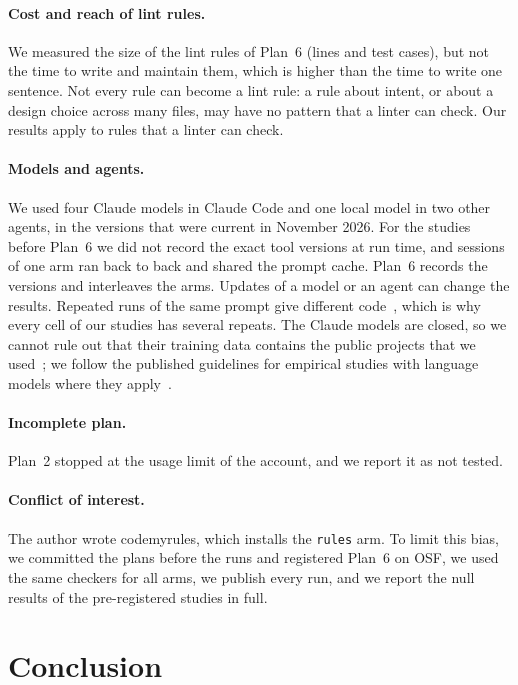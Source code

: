 \documentclass[pdflatex,sn-mathphys-num]{sn-jnl}
\newcommand{\arm}[1]{\texttt{#1}}
\begin{document}
\paragraph{Cost and reach of lint rules.}
We measured the size of the lint rules of Plan~6 (lines and test cases), but not the time to write and maintain them, which is higher than the time to write one sentence.
Not every rule can become a lint rule: a rule about intent, or about a design choice across many files, may have no pattern that a linter can check.
Our results apply to rules that a linter can check.

\paragraph{Models and agents.}
We used four Claude models in Claude Code and one local model in two other agents, in the versions that were current in November 2026.
For the studies before Plan~6 we did not record the exact tool versions at run time, and sessions of one arm ran back to back and shared the prompt cache.
Plan~6 records the versions and interleaves the arms.
Updates of a model or an agent can change the results.
Repeated runs of the same prompt give different code~\cite{ouyang2025nondeterminism}, which is why every cell of our studies has several repeats.
The Claude models are closed, so we cannot rule out that their training data contains the public projects that we used~\cite{sallou2024threats}; we follow the published guidelines for empirical studies with language models where they apply~\cite{baltes2025guidelines}.

\paragraph{Incomplete plan.}
Plan~2 stopped at the usage limit of the account, and we report it as not tested.

\paragraph{Conflict of interest.}
The author wrote codemyrules, which installs the \arm{rules} arm.
To limit this bias, we committed the plans before the runs and registered Plan~6 on OSF, we used the same checkers for all arms, we publish every run, and we report the null results of the pre-registered studies in full.

\section{Conclusion}
\end{document}
